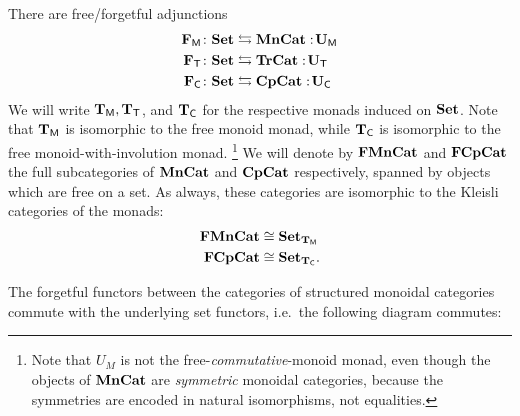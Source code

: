 \documentclass[11pt,oneside,article]{memoir}
\begin{document}
There are free/forgetful adjunctions
\begin{align*}
   \mathbf{F}_{\mathsf{M}}\colon\mathbf{Set} &\leftrightarrows\mathbf{MnCat}:\!\mathbf{U}_{\mathsf{M}} \\
   \mathbf{F}_{\mathsf{T}}\colon\mathbf{Set} &\leftrightarrows\mathbf{TrCat}:\!\mathbf{U}_{\mathsf{T}} \\
   \mathbf{F}_{\mathsf{C}}\colon\mathbf{Set} &\leftrightarrows\mathbf{CpCat}:\!\mathbf{U}_{\mathsf{C}}
\end{align*}
We will write $\mathbf{T}_{\mathsf{M}}, \mathbf{T}_{\mathsf{T}}$, and $\mathbf{T}_{\mathsf{C}}$ for the respective monads induced on $\mathbf{Set}$. Note that $\mathbf{T}_{\mathsf{M}}$ is
isomorphic to the free monoid monad, while $\mathbf{T}_{\mathsf{C}}$ is isomorphic to the free monoid-with-involution monad.%
\footnote{Note that $U_M$ is not the free-\emph{commutative}-monoid monad, even though the objects of $\mathbf{MnCat}$ are \emph{symmetric} monoidal categories, because the symmetries are encoded in natural isomorphisms, not equalities.
}
We will denote by $\mathbf{FMnCat}$ and $\mathbf{FCpCat}$ the full subcategories of $\mathbf{MnCat}$ and $\mathbf{CpCat}$
respectively, spanned by objects which are free on a set. As always, these categories are isomorphic
to the Kleisli categories of the monads: 
\begin{align}\label{dia:TMvsFrMonCat}
\mathbf{FMnCat}&\cong\mathbf{Set}_{\mathbf{T}_{\mathsf{M}}}
\\\nonumber
\mathbf{FCpCat}&\cong\mathbf{Set}_{\mathbf{T}_{\mathsf{C}}}.
\end{align}

The forgetful functors between the categories of structured monoidal categories commute with the
underlying set functors, i.e.~the following diagram commutes:
\end{document}
